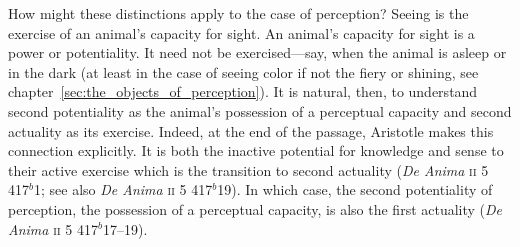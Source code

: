 How might these distinctions apply to the case of perception? Seeing is the exercise of an animal's capacity for sight. An animal's capacity for sight is a power or potentiality. It need not be exercised---say, when the animal is asleep or in the dark (at least in the case of seeing color if not the fiery or shining, see chapter~\ref{sec:the_objects_of_perception}). It is natural, then, to understand second potentiality as the animal's possession of a perceptual capacity and second actuality as its exercise. Indeed, at the end of the passage, Aristotle makes this connection explicitly. It is both the inactive potential for knowledge and sense to their active exercise which is the transition to second actuality (\emph{De Anima} \textsc{ii} 5 417\( ^{b} \)1; see also \emph{De Anima} \textsc{ii} 5 417\( ^{b} \)19). In which case, the second potentiality of perception, the possession of a perceptual capacity, is also the first actuality (\emph{De Anima} \textsc{ii} 5 417\( ^{b} \)17--19). 
% 

